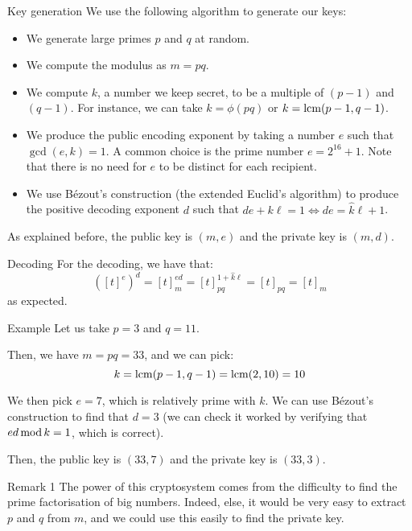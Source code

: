 \documentclass[a4paper]{article}
\begin{document}
\begin{parag}{Key generation}
    We use the following algorithm to generate our keys:
    \begin{itemize}
        \item We generate large primes $p$ and $q$ at random.
        \item We compute the modulus as $m = pq$.
        \item We compute $k$, a number we keep secret, to be a multiple of $\left(p-1\right)$ and $\left(q-1\right)$. For instance, we can take $k = \phi\left(pq\right)$ or $k = \lcm\left(p-1, q-1\right)$.
        \item We produce the public encoding exponent by taking a number $e$ such that $\gcd\left(e, k\right) = 1$. A common choice is the prime number $e = 2^{16} + 1$. Note that there is no need for $e$ to be distinct for each recipient.
        \item We use Bézout's construction (the extended Euclid's algorithm) to produce the positive decoding exponent $d$ such that $de + k \ell = 1 \iff de = \hat{k} \ell + 1$.
    \end{itemize}

    As explained before, the public key is $\left(m, e\right)$ and the private key is $\left(m, d\right)$.

    \begin{subparag}{Decoding}
        For the decoding, we have that:
        \[\left(\left[t\right]^e\right)^d = \left[t\right]_m^{ed} = \left[t\right]_{pq}^{1 + \hat{k} \ell } = \left[t\right]_{pq} = \left[t\right]_m\]
        as expected.
    \end{subparag}

    \begin{subparag}{Example}
        Let us take $p = 3$ and $q = 11$.

        Then, we have $m = pq = 33$, and we can pick:
        \[k = \lcm\left(p-1, q-1\right) = \lcm\left(2, 10\right) =  10\]

        We then pick $e = 7$, which is relatively prime with $k$. We can use Bézout's construction to find that $d = 3$ (we can check it worked by verifying that $ed \operatorname{mod} k = 1$, which is correct).

        Then, the public key is $\left(33, 7\right)$ and the private key is $\left(33, 3\right)$.
    \end{subparag}

    \begin{subparag}{Remark 1}
        The power of this cryptosystem comes from the difficulty to find the prime factorisation of big numbers. Indeed, else, it would be very easy to extract $p$ and $q$ from $m$, and we could use this easily to find the private key.
    \end{subparag}


\end{parag}
\end{document}
